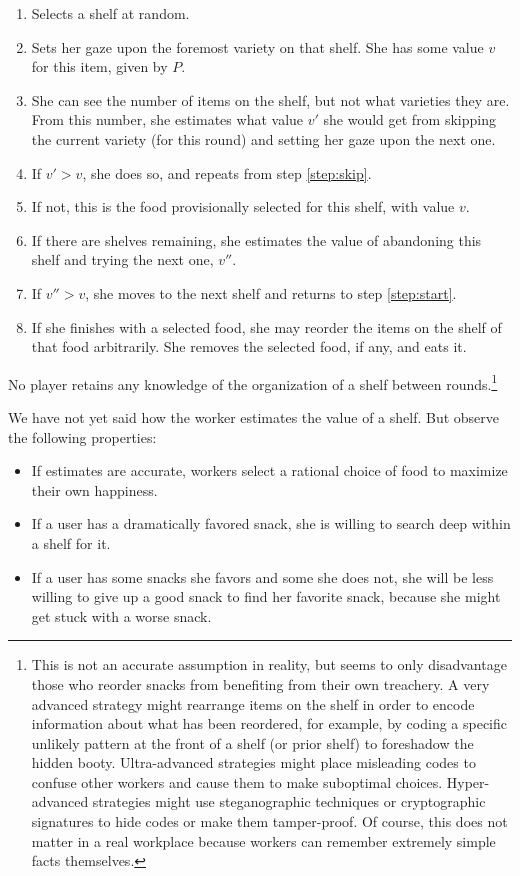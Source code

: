 \documentclass[twocolumn]{article}
\begin{document}
\begin{enumerate}
\item Selects a shelf at random.
\item Sets her gaze upon the foremost variety on that shelf. She has some value $v$ for this item, given by $P$. \label{step:start}
\item She can see the number of items on the shelf, but not what varieties they are. From this number, she estimates what value $v'$ she would get from skipping the current variety (for this round) and setting her gaze upon the next one. \label{step:skip}
\item If $v' > v$, she does so, and repeats from step \ref{step:skip}.
\item If not, this is the food provisionally selected for this shelf, with value $v$.
\item If there are shelves remaining, she estimates the value of abandoning this shelf and trying the next one, $v''$.
\item If $v'' > v$, she moves to the next shelf and returns to step \ref{step:start}.
\item If she finishes with a selected food, she may reorder the items on the shelf of that food arbitrarily. She removes the selected food, if any, and eats it.
\end{enumerate}

No player retains any knowledge of the organization of a shelf between rounds.\footnote{This is not an accurate assumption in reality, but seems to only disadvantage those who reorder snacks from benefiting from their own treachery. A very advanced strategy might rearrange items on the shelf in order to encode information about what has been reordered, for example, by coding a specific unlikely pattern at the front of a shelf (or prior shelf) to foreshadow the hidden booty. Ultra-advanced strategies might place misleading codes to confuse other workers and cause them to make suboptimal choices. Hyper-advanced strategies might use steganographic techniques or cryptographic signatures to hide codes or make them tamper-proof. Of course, this does not matter in a real workplace because workers can remember extremely simple facts themselves.}

We have not yet said how the worker estimates the value of a shelf. But observe the following properties:

\begin{itemize}
\item If estimates are accurate, workers select a rational choice of food to maximize their own happiness.
\item If a user has a dramatically favored snack, she is willing to search deep within a shelf for it.
\item If a user has some snacks she favors and some she does not, she will be less willing to give up a good snack to find her favorite snack, because she might get stuck with a worse snack.
\end{itemize}
\end{document}
